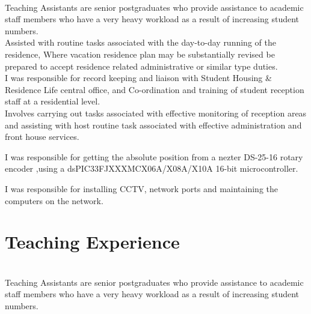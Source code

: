\documentclass[]{deedy-resume-openfont}
\begin{document}
\begin{minipage}[t]{0.66\textwidth}
\\
Teaching Assistants are senior postgraduates who provide assistance to academic staff members who have a very heavy workload as a result of increasing student numbers.
\sectionsep
\\
Assisted with routine tasks associated with the day-to-day running of the residence, Where vacation residence plan may be substantially revised be prepared to accept residence related administrative or similar type duties.
\sectionsep
\\
I was responsible for record keeping and liaison with Student Housing & Residence Life central office, and Co-ordination and training of student reception staff at a residential level.
\sectionsep
\\
Involves carrying out tasks associated with effective monitoring of reception areas and assisting with host routine task associated with effective administration and front house services.
\sectionsep

I was responsible for getting the absolute position from a nezter DS-25-16 rotary encoder ,using a dsPIC33FJXXXMCX06A/X08A/X10A 16-bit microcontroller.
\sectionsep

I was responsible for installing CCTV, network ports and maintaining the computers on the network.
\sectionsep


\section{Teaching Experience}
\\
Teaching Assistants are senior postgraduates who provide assistance to academic staff members who have a very heavy workload as a result of increasing student numbers.
\sectionsep


\end{minipage}
\end{document}
